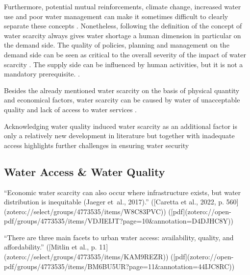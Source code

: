 {Furthermore, potential mutual reinforcements, climate change, increased water use and poor water management can make it sometimes difficult to clearly separate these concepts \autocite{idmpDroughtWaterScarcity2022,lealfilhoUnderstandingResponsesClimaterelated2022,liuWaterScarcityAssessments2017,rcrcFORECASTBASEDFINANCINGEARLY2020}. Nonetheless, following the definition of \autocite{faoCopingWaterScarcity2012} the concept of water scarcity always gives water shortage a human dimension in particular on the demand side. The quality of policies, planning and management on the demand side can be seen as critical to the overall severity of the impact of water scarcity \autocite{idmpDroughtWaterScarcity2022,faoCopingWaterScarcity2012,vereintenationenSpecialReportDrought2021}. The supply side can be influenced by human activities, but it is not a mandatory prerequisite. \autocite{idmpDroughtWaterScarcity2022}. 

Besides the already mentioned water scarcity on the basis of physical quantity and economical factors, water scarcity can be caused by water of unacceptable quality and lack of access to water services \autocite{faoCopingWaterScarcity2012}. 


Acknowledging water quality induced water scarcity as an additional factor is only a relatively new development in literature \autocite{liuThreedimensionalWaterScarcity2020} but together with inadequate access highlights further challenges in ensuring water security \autocite{caretta2022water, mishraWaterSecurityChanging2021}



\subsection{Water Access \& Water Quality}

“Economic water scarcity can also occur where infrastructure exists, but water distribution is inequitable (Jaeger et al., 2017).” ([Caretta et al., 2022, p. 560](zotero://select/groups/4773535/items/W8C83PVC)) ([pdf](zotero://open-pdf/groups/4773535/items/VDJIEIJT?page=10&annotation=D4DJHC8Y))


“There are three main facets to urban water access: availability, quality, and affordability.” ([Mitlin et al., p. 11](zotero://select/groups/4773535/items/KAM9REZR)) ([pdf](zotero://open-pdf/groups/4773535/items/BM6BU5UR?page=11&annotation=44IJC8RC))

}
